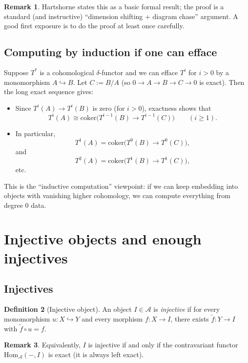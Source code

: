 \documentclass[11pt]{article}
\theoremstyle{definition}
\newtheorem{definition}{Definition}[section]
\newtheorem{remark}[definition]{Remark}
\theoremstyle{plain}
\newcommand{\Hom}{\mathrm{Hom}}
\newcommand{\coker}{\mathrm{coker}}
\begin{document}
\begin{remark}
Hartshorne states this as a basic formal result; the proof is a standard (and instructive) ``dimension shifting + diagram chase'' argument. A good first exposure is to do the proof at least once carefully.
\end{remark}

\subsection{Computing by induction if one can efface}

Suppose $T^\ast$ is a cohomological $\delta$-functor and we can efface $T^i$ for $i>0$ by a monomorphism $A\hookrightarrow B$. Let $C:=B/A$ (so $0\to A\to B\to C\to 0$ is exact). Then the long exact sequence gives:

\begin{itemize}
\item Since $T^i(A)\to T^i(B)$ is zero (for $i>0$), exactness shows that
\[
T^i(A)\cong \coker\bigl(T^{i-1}(B)\to T^{i-1}(C)\bigr)\qquad (i\ge 1).
\]
\item In particular,
\[
T^1(A)=\coker\bigl(T^0(B)\to T^0(C)\bigr),
\]
and
\[
T^2(A)=\coker\bigl(T^1(B)\to T^1(C)\bigr),
\]
etc.
\end{itemize}

This is the ``inductive computation'' viewpoint: if we can keep embedding into objects with vanishing higher cohomology, we can compute everything from degree $0$ data.

\section{Injective objects and enough injectives}

\subsection{Injectives}

\begin{definition}[Injective object]\label{def:injective}
An object $I\in \mathcal{A}$ is \emph{injective} if for every monomorphism $u:X\hookrightarrow Y$ and every morphism $f:X\to I$, there exists $\tilde f:Y\to I$ with $\tilde f\circ u=f$.
\end{definition}

\begin{remark}
Equivalently, $I$ is injective if and only if the contravariant functor $\Hom_{\mathcal{A}}(-,I)$ is exact (it is always left exact).
\end{remark}
\end{document}
